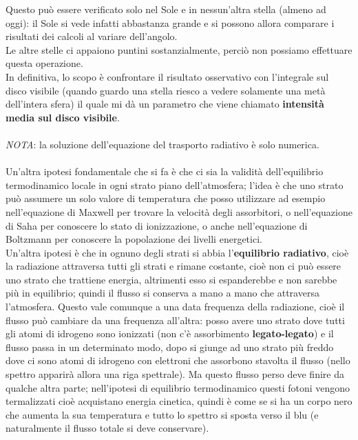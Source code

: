 \documentclass[a4paper,11pt]{article}
\begin{document}
Questo può essere verificato solo nel Sole e in nessun'altra stella (almeno ad oggi): il Sole si vede infatti abbastanza grande e si possono allora comparare i risultati dei calcoli al variare dell'angolo.\\ Le altre stelle ci appaiono puntini sostanzialmente, perciò non possiamo effettuare questa operazione.
\\ In definitiva, lo scopo è confrontare il risultato osservativo con l'integrale  sul disco visibile (quando guardo una stella riesco a vedere solamente una metà dell'intera sfera) il quale mi dà un parametro che viene chiamato \textbf{intensità media sul disco visibile}. \\ \\ \textit{NOTA}: la soluzione dell'equazione del trasporto radiativo è solo numerica. \\ \\ 
Un'altra ipotesi fondamentale che si fa è che ci sia la validità dell'equilibrio termodinamico locale in ogni strato piano dell'atmosfera; l'idea è che uno strato può assumere un solo valore di temperatura che posso utilizzare ad esempio nell'equazione di Maxwell per trovare la velocità degli assorbitori, o nell'equazione di Saha per conoscere lo stato di ionizzazione, o anche nell'equazione di Boltzmann per conoscere la popolazione dei livelli energetici.\\
Un'altra ipotesi è che in ognuno degli strati si abbia l'\textbf{equilibrio radiativo}, cioè la radiazione attraversa tutti gli strati e rimane costante, cioè non ci può essere uno strato che trattiene energia, altrimenti esso si espanderebbe e non sarebbe più in equilibrio; quindi il flusso si conserva a mano a mano che attraversa l'atmosfera. Questo vale comunque a una data frequenza della radiazione, cioè il flusso può cambiare da una frequenza all'altra: posso avere uno strato dove tutti gli atomi di idrogeno sono ionizzati (non c'è assorbimento \textbf{legato-legato}) e il flusso passa in un determinato modo, dopo si giunge ad uno strato più freddo dove ci sono atomi di idrogeno con elettroni che assorbono stavolta il flusso (nello spettro apparirà allora una riga spettrale). Ma questo flusso perso deve finire da qualche altra parte; nell'ipotesi di equilibrio termodinamico questi fotoni vengono termalizzati cioè acquistano energia cinetica, quindi è come se si ha un corpo nero che aumenta la sua temperatura e tutto lo spettro si sposta verso il blu (e naturalmente il flusso totale si deve conservare). \\ \\
\end{document}
